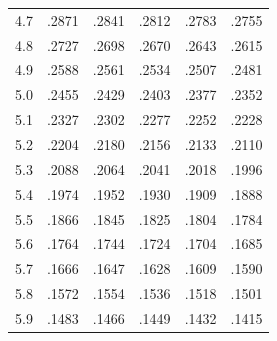 \begin{minipage}[t]{95mm}
{\begin{tabular}{cccccc}
        4.7            & .2871                    & .2841                    & .2812                    & .2783                    & .2755                    \\
        4.8            & .2727                    & .2698                    & .2670                    & .2643                    & .2615                    \\
        4.9            & .2588                    & .2561                    & .2534                    & .2507                    & .2481                    \\[1.5ex]
        5.0            & .2455                    & .2429                    & .2403                    & .2377                    & .2352                    \\
        5.1            & .2327                    & .2302                    & .2277                    & .2252                    & .2228                    \\
        5.2            & .2204                    & .2180                    & .2156                    & .2133                    & .2110                    \\
        5.3            & .2088                    & .2064                    & .2041                    & .2018                    & .1996                    \\
        5.4            & .1974                    & .1952                    & .1930                    & .1909                    & .1888                    \\
        5.5            & .1866                    & .1845                    & .1825                    & .1804                    & .1784                    \\
        5.6            & .1764                    & .1744                    & .1724                    & .1704                    & .1685                    \\
        5.7            & .1666                    & .1647                    & .1628                    & .1609                    & .1590                    \\
        5.8            & .1572                    & .1554                    & .1536                    & .1518                    & .1501                    \\
        5.9            & .1483                    & .1466                    & .1449                    & .1432                    & .1415                    \\[1.5ex]

\end{tabular}}
\end{minipage}
